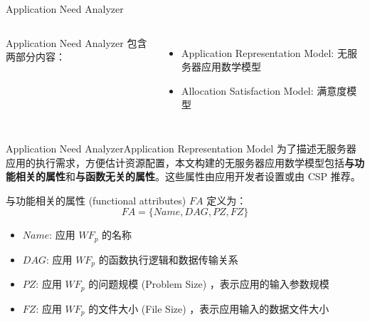 \documentclass[aspectratio=169]{beamer}
\begin{document}
\begin{frame}{Application Need Analyzer}
\begin{columns}
    Application Need Analyzer 包含两部分内容：
    \begin{itemize}
      \item Application Representation Model: 无服务器应用数学模型
      \item Allocation Satisfaction Model: 满意度模型
    \end{itemize}
  \end{columns}
  \hfill\hyperlink{label:architecture-1}{}
\end{frame}

\begin{frame}{Application Need Analyzer}{Application Representation Model}\label{label:functional-attributes}
  为了描述无服务器应用的执行需求，方便估计资源配置，本文构建的无服务器应用数学模型包括\textbf{与功能相关的属性}和\textbf{与函数无关的属性}。这些属性由应用开发者设置或由 CSP 推荐。

  \vfill

  与功能相关的属性 (functional attributes) $FA$ 定义为：
  \begin{equation*}
    FA = \{Name, DAG, PZ, FZ\}
  \end{equation*}
  \begin{itemize}
    \item $Name$: 应用 $WF_p$ 的名称
    \item $DAG$: 应用 $WF_p$ 的函数执行逻辑和数据传输关系
    \item $PZ$: 应用 $WF_p$ 的问题规模 (Problem Size) ，表示应用的输入参数规模
    \item $FZ$: 应用 $WF_p$ 的文件大小 (File Size) ，表示应用输入的数据文件大小
  \end{itemize}
  \hfill\hyperlink{label:sample-representation}{}
\end{frame}
\end{document}

